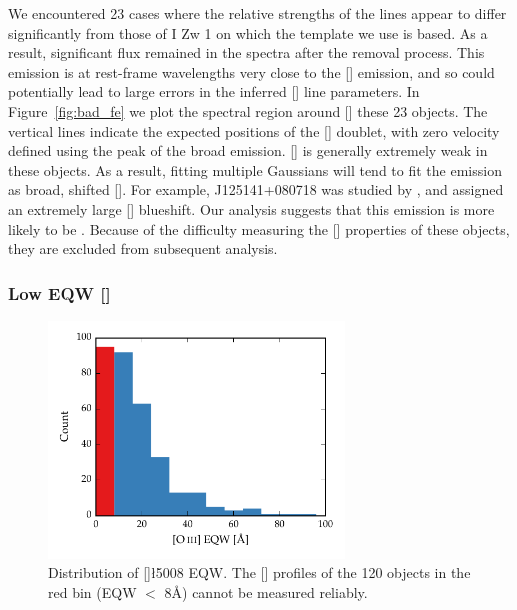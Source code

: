 We encountered 23 cases where the relative strengths of the  lines appear to differ significantly from those of I Zw 1 on which the  template we use is based. 
As a result, significant  flux remained in the spectra after the removal process. 
This emission is at rest-frame wavelengths very close to the [] emission, and so could potentially lead to large errors in the inferred [] line parameters. 
In Figure~\ref{fig:bad_fe} we plot the spectral region around [] these 23 objects.
The vertical lines indicate the expected positions of the [] doublet, with zero velocity defined using the peak of the broad \hb emission. 
[] is generally extremely weak in these objects. 
As a result, fitting multiple Gaussians will tend to fit the  emission as broad, shifted []. 
For example, J125141+080718 was studied by \citet{shen16a}, and assigned an extremely large [] blueshift. 
Our analysis suggests that this emission is more likely to be . 
Because of the difficulty measuring the [] properties of these objects, they are excluded from subsequent analysis.  

\subsubsection{Low \ac{EQW} []}

\begin{figure}
    \centering
    \includegraphics[width=0.7\textwidth]{figures/chapter04/oiii_eqw_hist.pdf} 
    \caption{Distribution of []\l5008 \ac{EQW}. The [] profiles of the 120 objects in the red bin (\ac{EQW} $<$ 8\AA) cannot be measured reliably.}     
    \label{fig:oiii_strength_hist}
\end{figure}

